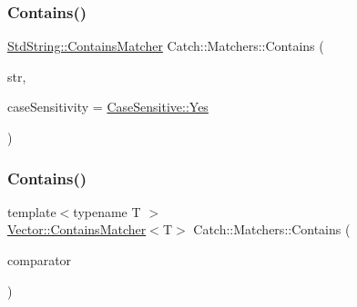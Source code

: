 \subsubsection{\texorpdfstring{Contains()}{Contains()}\hspace{0.1cm}{\footnotesize\ttfamily [1/2]}}
{\footnotesize\ttfamily \mbox{\hyperlink{struct_catch_1_1_matchers_1_1_std_string_1_1_contains_matcher}{Std\+String\+::\+Contains\+Matcher}} Catch\+::\+Matchers\+::\+Contains (\begin{DoxyParamCaption}\item[{std\+::string const \&}]{str,  }\item[{\mbox{\hyperlink{struct_catch_1_1_case_sensitive_aad49d3aee2d97066642fffa919685c6a}{Case\+Sensitive\+::\+Choice}}}]{case\+Sensitivity = {\ttfamily \mbox{\hyperlink{struct_catch_1_1_case_sensitive_aad49d3aee2d97066642fffa919685c6aa7c5550b69ec3c502e6f609b67f9613c6}{Case\+Sensitive\+::\+Yes}}} }\end{DoxyParamCaption})}

\mbox{\label{namespace_catch_1_1_matchers_a4b3621740dc515216ad31ab827d4092c}} 
\subsubsection{\texorpdfstring{Contains()}{Contains()}\hspace{0.1cm}{\footnotesize\ttfamily [2/2]}}
{\footnotesize\ttfamily template$<$typename T $>$ \\
\mbox{\hyperlink{struct_catch_1_1_matchers_1_1_vector_1_1_contains_matcher}{Vector\+::\+Contains\+Matcher}}$<$T$>$ Catch\+::\+Matchers\+::\+Contains (\begin{DoxyParamCaption}\item[{std\+::vector$<$ T $>$ const \&}]{comparator }\end{DoxyParamCaption})}

\mbox{\label{namespace_catch_1_1_matchers_ae5a45efb4538c57c43e04f3f9043ad6e}} 
